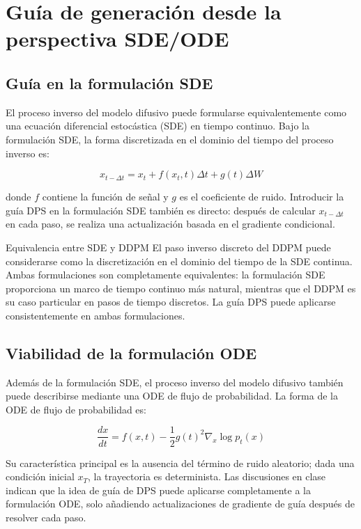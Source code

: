 \section{Guía de generación desde la perspectiva SDE/ODE}

\subsection{Guía en la formulación SDE}

El proceso inverso del modelo difusivo puede formularse equivalentemente como una ecuación diferencial estocástica (SDE) en tiempo continuo. Bajo la formulación SDE, la forma discretizada en el dominio del tiempo del proceso inverso es:

$$x_{t-\Delta t} = x_t + f(x_t, t)\Delta t + g(t)\Delta W$$

donde $f$ contiene la función de señal y $g$ es el coeficiente de ruido. Introducir la guía DPS en la formulación SDE también es directo: después de calcular $x_{t-\Delta t}$ en cada paso, se realiza una actualización basada en el gradiente condicional.

\begin{importantbox}{Equivalencia entre SDE y DDPM}
El paso inverso discreto del DDPM puede considerarse como la discretización en el dominio del tiempo de la SDE continua. Ambas formulaciones son completamente equivalentes: la formulación SDE proporciona un marco de tiempo continuo más natural, mientras que el DDPM es su caso particular en pasos de tiempo discretos. La guía DPS puede aplicarse consistentemente en ambas formulaciones.
\end{importantbox}

\subsection{Viabilidad de la formulación ODE}

Además de la formulación SDE, el proceso inverso del modelo difusivo también puede describirse mediante una ODE de flujo de probabilidad. La forma de la ODE de flujo de probabilidad es:

$$\frac{dx}{dt} = f(x, t) - \frac{1}{2}g(t)^2 \nabla_x \log p_t(x)$$

Su característica principal es la ausencia del término de ruido aleatorio; dada una condición inicial $x_T$, la trayectoria es determinista. Las discusiones en clase indican que la idea de guía de DPS puede aplicarse completamente a la formulación ODE, solo añadiendo actualizaciones de gradiente de guía después de resolver cada paso.

